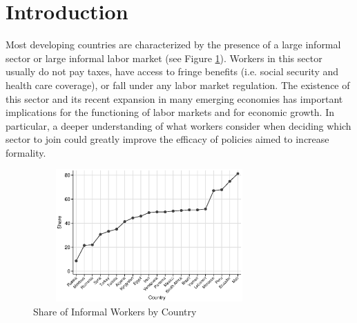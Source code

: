 \documentclass{svjour3}                     %
\begin{document}
\section{Introduction} \label{section:introduction}
\noindent Most developing countries are characterized by the presence of a large informal sector or large informal labor market (see Figure \ref{figure:figure0}). Workers in this sector usually do not pay taxes, have access to fringe benefits (i.e. social security and health care coverage), or fall under any labor market regulation. The existence of this sector and its recent expansion in many emerging economies has important implications for the functioning of labor markets and for economic growth. In particular, a deeper understanding of what workers consider when deciding which sector to join could greatly improve the efficacy of policies aimed to increase formality.\\
\begin{center}
\begin{figure}[H] 
\caption{Share of Informal Workers by Country}
\label{figure:figure0}
\centering
\includegraphics[width=3.5in, height=2in]{cross.eps}
\end{figure}
\end{center}
\end{document}

